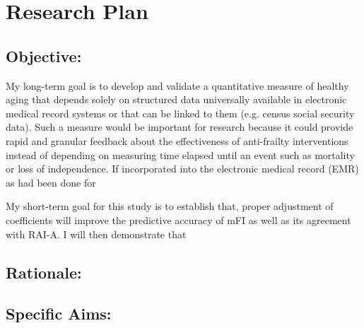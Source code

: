 \section{Research Plan }\label{research-plan}


\subsection{Objective:}\label{objective}
  
My long-term goal is to develop and validate a quantitative measure of healthy aging that depends solely on structured data universally available in electronic medical record systems or that can be linked to them (e.g. census social security data). Such a measure would be important for research because it could provide rapid and granular feedback about the effectiveness of anti-frailty interventions instead of depending on measuring time elapsed until an event such as mortality or loss of independence. If incorporated into the electronic medical record (EMR) as had been done for  

My short-term goal for this study is to establish that, proper adjustment of coefficients will improve the predictive accuracy of mFI as well as its agreement with RAI-A. I will then demonstrate that 

\subsection{Rationale:}\label{rationale}

\subsection{Specific Aims:}\label{specific-aims}
